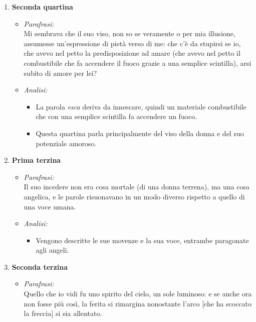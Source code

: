 \documentclass{article}
\begin{document}
\begin{enumerate}
\begin{enumerate}[label=]
            \item \textbf{Seconda quartina}
                \begin{itemize}[label=]
                    \item \textit{Parafrasi:}\\
                        Mi sembrava che il suo viso, non so se veramente o per mia illusione, assumesse un'espressione di pietà verso di me: che c'è da stupirsi se io, che avevo nel petto la predisposizione ad amare (che avevo nel petto il combustibile che fa accendere il fuoco grazie a una semplice scintilla), arsi subito di amore per lei?
                    \item \textit{Analisi:}
                        \begin{itemize}
                            \item La parola \textit{esca} deriva da innescare, quindi un materiale combustibile che con una semplice scintilla fa accendere un fuoco.
                            \item Questa quartina parla principalmente del viso della donna e del suo potenziale amoroso.
                        \end{itemize}
                \end{itemize}
            \item \textbf{Prima terzina}
                \begin{itemize}[label=]
                    \item \textit{Parafrasi:}\\
                        Il suo incedere non era cosa mortale (di una donna terrena), ma una cosa angelica, e le parole risuonavano in un modo diverso rispetto a quello di una voce umana.
                    \item \textit{Analisi:}
                        \begin{itemize}
                            \item Vengono descritte le sue movenze e la sua voce, entrambe paragonate agli angeli.
                        \end{itemize}
                \end{itemize}
            \item \textbf{Seconda terzina}
                \begin{itemize}[label=]
                    \item \textit{Parafrasi:}\\
                        Quello che io vidi fu uno spirito del cielo, un sole luminoso: e se anche ora non fosse più così, la ferita si rimargina nonostante l'arco [che ha scoccato la freccia] si sia allentato.

\end{itemize}
\end{enumerate}
\end{enumerate}
\end{document}
